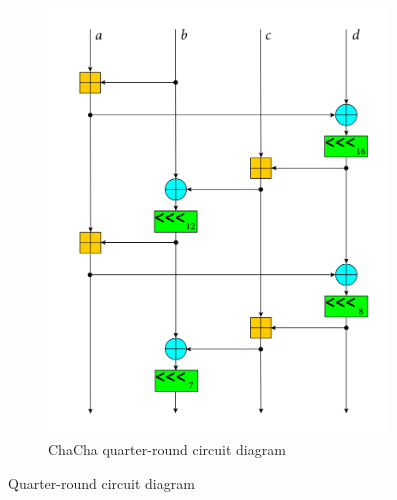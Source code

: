 \begin{figure}
\begin{subfigure}[t]{0.47\textwidth}
  \includegraphics[width=0.99\textwidth]{figures/wiki-qr-circuit/chacha-wiki-qr-circuit.png}
  \caption{ChaCha quarter-round circuit diagram}
  \label{fig:wiki.qr.circuit.chacha}
\end{subfigure}
\caption{Quarter-round circuit diagram}
\label{fig:wiki.qr.circuit}
\end{figure}

